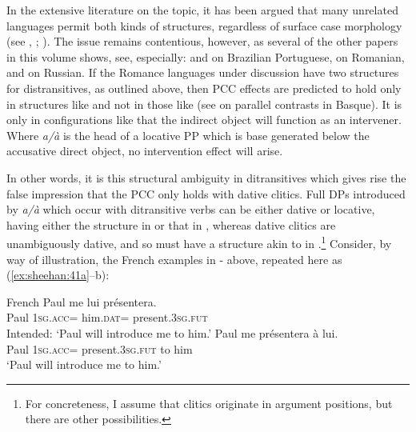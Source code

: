 \documentclass[output=paper,colorlinks,citecolor=brown,nonflat]{langsci/langscibook}
\begin{document}
In the extensive literature on the topic, it has been argued that many unrelated languages permit both kinds of structures, regardless of surface case morphology (see \citealt{Marantz1993, Pesetsky1995, Cuervo2003, Anagnostopoulou2003, Pylkkänen2002}, \citeyear{Pylkkänen2008}; \citealt{MiyagawaTsujioka2004, Bruening2010DOC, HarleyMiyagawa2017}). The issue remains contentious, however, as several of the other papers in this volume shows, see, especially:  and  on Brazilian Portuguese,  on Romanian, and  on Russian. If the Romance languages under discussion have two structures for distransitives, as outlined above, then PCC effects are predicted to hold only in structures like  and not in those like  (see \citealt{Rezac2008} on parallel contrasts in Basque). It is only in configurations like  that the indirect object will function as an intervener. Where \textit{a/à} is the head of a locative PP which is base generated below the accusative direct object, no intervention effect will arise.

In other words, it is this structural ambiguity in ditransitives which gives rise the false impression that the PCC only holds with dative clitics. Full DPs introduced by \textit{a/à} which occur with ditransitive verbs can be either dative or locative, having either the structure in  or that in , whereas dative clitics are unambiguously dative, and so must have a structure akin to in .\footnote{For concreteness, I assume that clitics originate in argument positions, but there are other possibilities.} Consider, by way of illustration, the French examples in - above, repeated here as (\ref{ex:sheehan:41a}--b):

\ea%
    \label{ex:sheehan:41}
    French \citep[173--174]{Kayne1975}
    \ea\label{ex:sheehan:41a}
    \gll    *Paul   me       lui       présentera.\\
            Paul   \textsc{1sg}.\textsc{acc}=   him.\textsc{dat=} present.\textsc{3sg.fut}\\
    \glt    Intended: ‘Paul will introduce me to him.’
    \ex\label{ex:sheehan:41b}
    \gll    Paul   me     présentera     à lui.\\
            Paul  \textsc{1sg}.\textsc{acc}=  present.\textsc{3sg.fut}   to him\\
    \glt    ‘Paul will introduce me to him.’
    \z
\z
\end{document}
